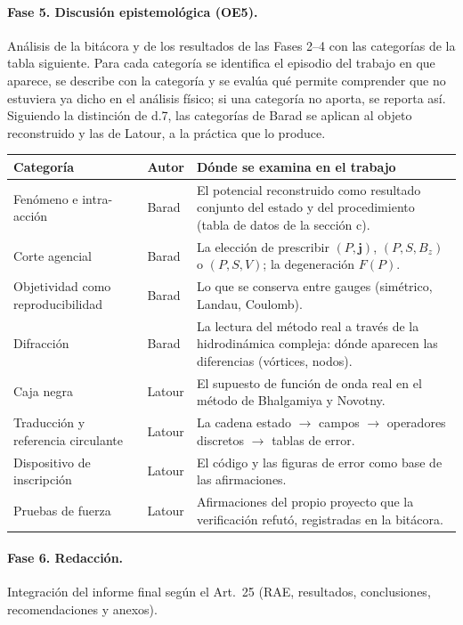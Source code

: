 \documentclass[12pt,letterpaper]{article}
\newcommand{\jv}{\mathbf{j}}
\begin{document}
\paragraph{Fase 5. Discusión epistemológica (OE5).} Análisis de la bitácora y de los resultados de las Fases 2--4 con las
categorías de la tabla siguiente. Para cada categoría se identifica el episodio del trabajo en que aparece, se describe
con la categoría y se evalúa qué permite comprender que no estuviera ya dicho en el análisis físico; si una categoría no
aporta, se reporta así. Siguiendo la distinción de d.7, las categorías de Barad se aplican al objeto reconstruido y las de
Latour, a la práctica que lo produce.
\begin{center}
\begin{tabular}{@{}p{3.6cm} p{1.6cm} p{9.2cm}@{}}
\toprule
\textbf{Categoría} & \textbf{Autor} & \textbf{Dónde se examina en el trabajo} \\
\midrule
Fenómeno e intra-acción & Barad & El potencial reconstruido como resultado conjunto del estado y del procedimiento (tabla de datos de la sección c). \\
Corte agencial & Barad & La elección de prescribir $(P,\jv)$, $(P,S,B_z)$ o $(P,S,V)$; la degeneración $F(P)$. \\
Objetividad como reproducibilidad & Barad & Lo que se conserva entre gauges (simétrico, Landau, Coulomb). \\
Difracción & Barad & La lectura del método real a través de la hidrodinámica compleja: dónde aparecen las diferencias (vórtices, nodos). \\
Caja negra & Latour & El supuesto de función de onda real en el método de Bhalgamiya y Novotny. \\
Traducción y referencia circulante & Latour & La cadena estado $\to$ campos $\to$ operadores discretos $\to$ tablas de error. \\
Dispositivo de inscripción & Latour & El código y las figuras de error como base de las afirmaciones. \\
Pruebas de fuerza & Latour & Afirmaciones del propio proyecto que la verificación refutó, registradas en la bitácora. \\
\bottomrule
\end{tabular}
\end{center}

\paragraph{Fase 6. Redacción.} Integración del informe final según el Art.~25 (RAE, resultados, conclusiones,
recomendaciones y anexos).
\end{document}
